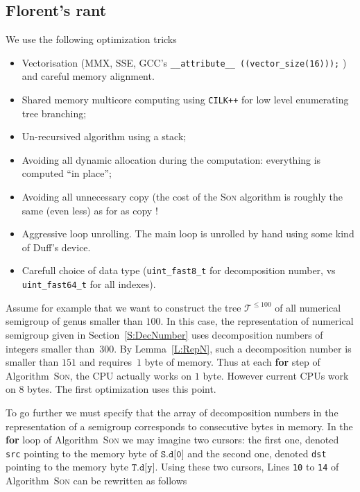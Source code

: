 \documentclass[reqno,11pt]{amsart}
\theoremstyle{plain}
\theoremstyle{definition}
\renewcommand{\leq}{\leqslant}
\renewcommand{\tt}[1]{\texttt{#1}}
\begin{document}
\subsection{Florent's rant}

We use the following optimization tricks
\begin{itemize}
\item Vectorisation (MMX, SSE, GCC's 
\verb|__attribute__ ((vector_size(16)));|
) and careful memory alignment.
\item Shared memory multicore computing using \texttt{CILK++} for low level
  enumerating tree branching;
\item Un-recursived algorithm using a stack;
\item Avoiding all dynamic allocation during the computation: everything is
  computed ``in place'';
\item Avoiding all unnecessary copy (the cost of the \textsc{Son} algorithm is
  roughly the same (even less) as for as copy !
\item Aggressive loop unrolling. The main loop is unrolled by hand using some
  kind of Duff's device.
\item Carefull choice of data type (\verb|uint_fast8_t| for decomposition
  number, vs \verb|uint_fast64_t| for all indexes).
\end{itemize}

\label{S:Opti}

Assume for example that we want to construct the tree $\mathcal{T}^{\leq 100}$ of all  numerical semigroup of  genus smaller than $100$. 
In this case, the representation of  numerical  semigroup given in Section~\ref{S:DecNumber} uses decomposition numbers of integers smaller than~$300$.
By Lemma~\ref{L:RepN}, such a decomposition number is smaller than $151$ and requires~$1$ byte of memory.
Thus at each \textbf{for} step of Algorithm~\textsc{Son}, the CPU actually works on $1$ byte. 
However current CPUs work on $8$ bytes.
The first optimization uses this point.

To go further we must specify that the array of decomposition numbers in the representation of a semigroup corresponds to consecutive bytes in memory. 
In the \textbf{for} loop of Algorithm~\textsc{Son} we may imagine two cursors: the first one, denoted \texttt{src}  pointing to the memory byte of $\texttt{S.d[0]}$  and the second one, denoted \texttt{dst} pointing to the memory byte $\texttt{T.d[y]}$.
Using these two cursors, Lines \tt{10} to \tt{14} of Algorithm~\textsc{Son} can be rewritten as follows
\end{document}
